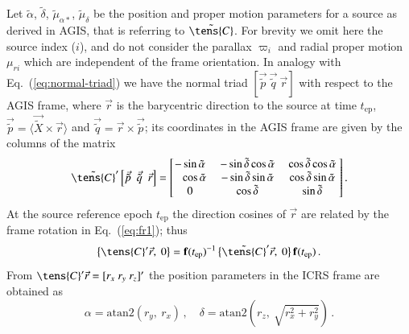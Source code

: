 \documentclass[structabstract]{aa}
\newcommand{\quat}[1]{\mathbf{#1}}
\begin{document}
Let $\tilde{\alpha}$, $\tilde{\delta}$, $\tilde{\mu}_{\alpha*}$, 
$\tilde{\mu}_{\delta}$ be the position and proper motion parameters 
for a source as derived in AGIS, that is referring to $\tilde{\tens{C}}$. For
brevity we omit here the source index ($i$), and do not consider 
the parallax $\varpi_i$ and radial proper motion $\mu_{ri}$ which 
are independent of the frame orientation. 
In analogy with Eq.~(\ref{eq:normal-triad}) we have the normal 
triad $[\vec{\tilde{p}}~\vec{\tilde{q}}~\vec{r}]$ with respect 
to the AGIS frame, where $\vec{r}$ is the barycentric direction to the
source at time $t_\text{ep}$, 
$\vec{\tilde{p}}=\langle\vec{\tilde{X}}\times\vec{r}\rangle$
and $\vec{\tilde{q}}=\vec{r}\times\vec{\tilde{p}}$; its coordinates
in the AGIS frame are given by the columns of the matrix
\begin{equation}\label{eq:normal-triad-AGIS}
\tilde{\tens{C}}'\left[\vec{\tilde{p}}~~\vec{\tilde{q}}~~\vec{r}\right]
= \begin{bmatrix} -\sin\tilde{\alpha} &~ -\sin\tilde{\delta}\cos\tilde{\alpha}
&~ \cos\tilde{\delta}\cos\tilde{\alpha}~ \\ 
\phantom{-}\cos\tilde{\alpha} &~ -\sin\tilde{\delta}\sin\tilde{\alpha} &~
\cos\tilde{\delta}\sin\tilde{\alpha}~ \\ 
0 &~ \cos\tilde{\delta} &~ \sin\tilde{\delta}~ \end{bmatrix}.
\end{equation}
At the source reference epoch $t_\text{ep}$ the direction cosines
of $\vec{r}$ are related by the frame rotation in Eq.~(\ref{eq:fr1});
thus
\begin{equation}\label{eq:fr-r}
\left\{ \tens{C}'\vec{r},~0 \right\} = \quat{f}(t_\text{ep})^{-1}
\,\big\{ \tilde{\tens{C}}'\vec{r},~0 \big\}\, \quat{f}(t_\text{ep}) \, .
\end{equation} 
From $\tens{C}'\vec{r}=[r_x~r_y~r_z]'$ the position parameters in the 
ICRS frame are obtained as
\begin{equation}\label{eq:fr-ad}
\alpha = \text{atan2}(r_y,~r_x)\, , \quad 
\delta = \text{atan2}\left(r_z,~\sqrt{r_x^2+r_y^2}\right) \, .
\end{equation} 
\end{document}

